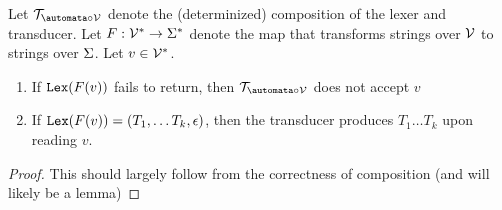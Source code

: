 \begin{theorem}
    \label{thm:CompositeLexTransducerLexEquiv}
    Let $\transducer_{\automata \circ \vocab}$ denote the (determinized) composition of the lexer and transducer. Let $F : \mathcal{V}^{*} \to \Sigma^{*}$ denote the map that transforms strings over $\mathcal{V}$ to strings over $\Sigma$. Let $v \in \mathcal{V}^{*}$.

    \begin{enumerate}
        \item If $\mathtt{Lex}(F(v))$ fails to return, then $\transducer_{\automata \circ \vocab}$ does not accept $v$
        \item If $\mathtt{Lex}(F(v)) = (T_1, \ldots T_k, \epsilon)$, then the transducer produces $T_1 \ldots T_k$ upon reading $v$.
    \end{enumerate}
\end{theorem}
\begin{proof}
    This should largely follow from the correctness of composition (and will likely be a lemma)
\end{proof}

